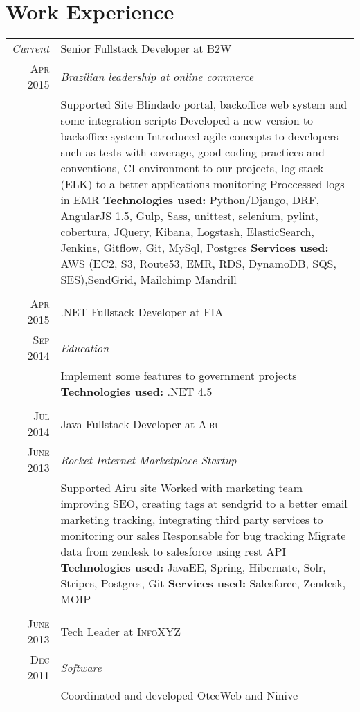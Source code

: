 \documentclass[a4paper,10pt]{article}
\begin{document}
\section{Work Experience}
\begin{tabular}{r|p{11cm}}
 \emph{Current} & Senior Fullstack Developer at \textsc{B2W} \\\textsc{Apr 2015}&\emph{Brazilian leadership at online commerce }\\&\footnotesize{
  Supported Site Blindado portal, backoffice web system and some integration scripts\newline
  Developed a new version to backoffice system\newline
    Introduced agile concepts to developers such as tests with coverage, good coding practices and conventions, CI environment to our projects, log stack (ELK) to a better applications monitoring\newline
    Proccessed logs in EMR\newline    
\textbf{Technologies used:} Python/Django, DRF, AngularJS 1.5, Gulp, Sass, unittest, selenium, pylint, cobertura, JQuery, Kibana, Logstash, ElasticSearch, Jenkins, Gitflow, Git, MySql, Postgres\newline
\textbf{Services used:} AWS (EC2, S3, Route53, EMR, RDS, DynamoDB, SQS, SES),SendGrid, Mailchimp Mandrill}\\\multicolumn{2}{c}{} \\
\textsc{Apr 2015}  & .NET Fullstack Developer at \textsc{FIA} \\
\textsc{Sep 2014}&\emph{Education}\\&\footnotesize{Implement some features to government projects\newline
\textbf{Technologies used:} .NET 4.5 
 }\\\multicolumn{2}{c}{} \\
 \textsc{Jul 2014} & Java Fullstack Developer at \textsc{Airu} \\\textsc{June 2013}&\emph{Rocket Internet Marketplace Startup}\\&\footnotesize{ Supported Airu site\newline
    Worked with marketing team improving SEO, creating tags at sendgrid to a better email marketing tracking, integrating third party services to monitoring our sales\newline
    Responsable for bug tracking\newline
    Migrate data from zendesk to salesforce using rest API\newline
\textbf{Technologies used:} JavaEE, Spring, Hibernate, Solr, Stripes, Postgres, Git\newline
\textbf{Services used:} Salesforce, Zendesk, MOIP 
 }\\\multicolumn{2}{c}{} \\
\textsc{June 2013} & Tech Leader at \textsc{InfoXYZ} \\\textsc{Dec 2011}&\emph{Software}\\&\footnotesize{  Coordinated and developed OtecWeb and Ninive\newline

}
\end{tabular}
\end{document}
